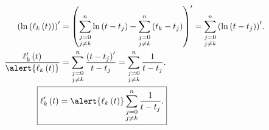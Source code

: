 \begin{frame}
\begin{solution}
        \begin{align*}
            {\left(
                \ln
                \left(
                    \ell_{k}
                    \left(t\right)
                    \right)
            \right)}^{\prime} & =
            {\left(
            \sum\limits_{\substack{j=0  \\j\neq k}}^{n}
            \ln
            \left(
            t-t_{j}
            \right)
            -\sum\limits_{\substack{j=0 \\j\neq k}}^{n}
            \left(
            t_{k}-t_{j}
            \right)
            \right)}^{\prime}=
            \sum\limits_{\substack{j=0  \\j\neq k}}^{n}
            {\left(
                \ln
                \left(
                t-t_{j}
                \right)
                \right)}^{\prime}.
            \\
            \dfrac{
                \ell^{\prime}_{k}
                \left(t\right)
            }{
                \alert{
                    \ell_{k}
                    \left(t\right)
                }
            }                 & =
            \sum\limits_{\substack{j=0  \\j\neq k}}^{n}
            \dfrac{{\left(t-t_{j}\right)}^{\prime}}{t-t_{j}}=
            \sum\limits_{\substack{j=0  \\j\neq k}}^{n}
            \dfrac{1}{t-t_{j}}.
            \\
            \Aboxed{
            \ell^{\prime}_{k}
            \left(t\right)    & =
            \alert{
                \ell_{k}
                \left(t\right)
            }
            \sum\limits_{\substack{j=0  \\j\neq k}}^{n}
            \dfrac{1}{t-t_{j}}.
            }
        \end{align*}
    \end{solution}
\end{frame}